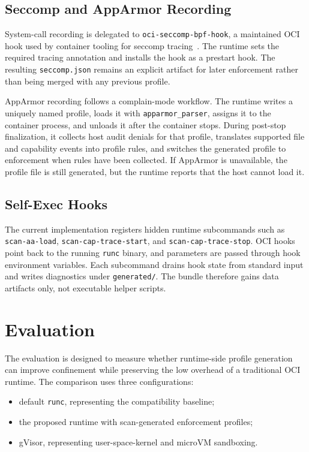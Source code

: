 \documentclass[runningheads]{llncs}
\begin{document}
\subsection{Seccomp and AppArmor Recording}

System-call recording is delegated to \texttt{oci-seccomp-bpf-hook}, a maintained OCI hook used by container tooling for seccomp tracing~\cite{ociseccompbpfhook}. The runtime sets the required tracing annotation and installs the hook as a prestart hook. The resulting \texttt{seccomp.json} remains an explicit artifact for later enforcement rather than being merged with any previous profile.

AppArmor recording follows a complain-mode workflow. The runtime writes a uniquely named profile, loads it with \texttt{apparmor\_parser}, assigns it to the container process, and unloads it after the container stops. During post-stop finalization, it collects host audit denials for that profile, translates supported file and capability events into profile rules, and switches the generated profile to enforcement when rules have been collected. If AppArmor is unavailable, the profile file is still generated, but the runtime reports that the host cannot load it.

\subsection{Self-Exec Hooks}

The current implementation registers hidden runtime subcommands such as \texttt{scan-aa-load}, \texttt{scan-cap-trace-start}, and \texttt{scan-cap-trace-stop}. OCI hooks point back to the running \texttt{runc} binary, and parameters are passed through hook environment variables. Each subcommand drains hook state from standard input and writes diagnostics under \texttt{generated/}. The bundle therefore gains data artifacts only, not executable helper scripts.

\section{Evaluation}\label{sec:evaluation}

The evaluation is designed to measure whether runtime-side profile generation can improve confinement while preserving the low overhead of a traditional OCI runtime. The comparison uses three configurations:

\begin{itemize}
\item default \texttt{runc}, representing the compatibility baseline;
\item the proposed runtime with scan-generated enforcement profiles;
\item gVisor, representing user-space-kernel and microVM sandboxing.
\end{itemize}
\end{document}
